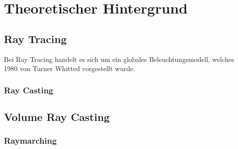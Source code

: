 
\chapter{Theoretischer Hintergrund}
\label{chap:theoretical_background}


\section{Ray Tracing}
\label{sec:ray_tracing}

Bei Ray Tracing handelt es sich um ein globales Beleuchtungsmodell, welches 1980 von Turner Whitted vorgestellt wurde.

\subsection{Ray Casting}
\label{subsec:ray_casting}


\section{Volume Ray Casting}
\label{sec:volume_ray_casting}


\subsection{Raymarching}
\label{subsec:raymarching}


